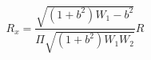 \begin{equation}
\label{complicate}
R_x = \frac{\sqrt{(1 + b^2) W_1 - b^2}}{\Pi \sqrt{(1 + b^2) W_1 W_2}} R
\end{equation}

